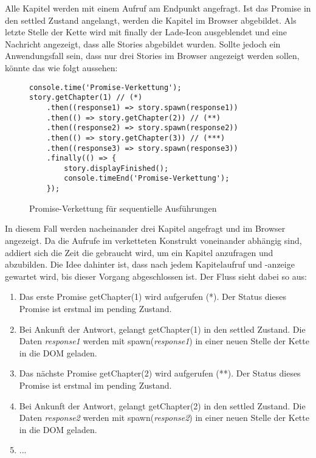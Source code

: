 \noindent
Alle Kapitel werden mit einem Aufruf am Endpunkt angefragt. Ist das Promise in den settled Zustand angelangt, werden die Kapitel im Browser abgebildet. Als letzte Stelle der Kette wird mit finally der Lade-Icon ausgeblendet und eine Nachricht angezeigt, dass alle Stories abgebildet wurden. Sollte jedoch ein Anwendungsfall sein, dass nur drei Stories im Browser angezeigt werden sollen, könnte das wie folgt aussehen: 

\begin{figure}[H]
\begin{lstlisting}[basicstyle=\small]
console.time('Promise-Verkettung');
story.getChapter(1) // (*)
    .then((response1) => story.spawn(response1))
    .then(() => story.getChapter(2)) // (**)
    .then((response2) => story.spawn(response2))
    .then(() => story.getChapter(3)) // (***)
    .then((response3) => story.spawn(response3))
    .finally(() => {
        story.displayFinished();
        console.timeEnd('Promise-Verkettung');
    });
\end{lstlisting}
\caption{Promise-Verkettung für sequentielle Ausführungen}
\label{Promises-sequential-calls}
\end{figure}

\noindent
In diesem Fall werden nacheinander drei Kapitel angefragt und im Browser angezeigt. Da die Aufrufe im verketteten Konstrukt voneinander abhängig sind, addiert sich die Zeit die gebraucht wird, um ein Kapitel anzufragen und abzubilden. Die Idee dahinter ist, dass nach jedem Kapitelaufruf und -anzeige gewartet wird, bis dieser Vorgang abgeschlossen ist. Der Fluss sieht dabei so aus:

\begin{enumerate}
    \item Das erste Promise getChapter(1) wird aufgerufen (*). Der Status dieses Promise ist erstmal im pending Zustand.
    \item Bei Ankunft der Antwort, gelangt getChapter(1) in den settled Zustand. Die Daten \textit{response1} werden mit spawn(\textit{response1}) in einer neuen Stelle der Kette in die DOM geladen.
    \item Das nächste Promise getChapter(2) wird aufgerufen (**). Der Status dieses Promise ist erstmal im pending Zustand. 
    \item Bei Ankunft der Antwort, gelangt getChapter(2) in den settled Zustand. Die Daten \textit{response2} werden mit spawn(\textit{response2}) in einer neuen Stelle der Kette in die DOM geladen.
    \item ...
\end{enumerate}

